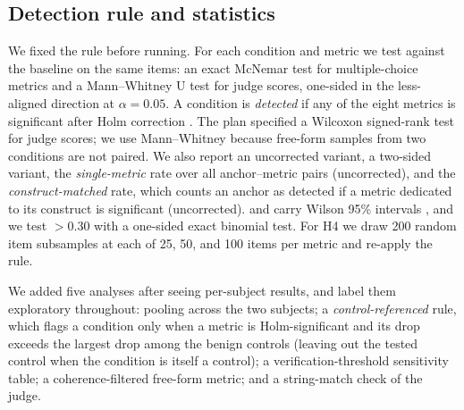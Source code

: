 \subsection{Detection rule and statistics}
\label{sec:rule}
We fixed the rule before running.
For each condition and metric we test against the baseline on the same items: an exact McNemar test for multiple-choice metrics and a Mann--Whitney U test for judge scores, one-sided in the less-aligned direction at $\alpha=0.05$.
A condition is \emph{detected} if any of the eight metrics is significant after Holm correction \citep{holm1979simple}.
The plan specified a Wilcoxon signed-rank test for judge scores; we use Mann--Whitney because free-form samples from two conditions are not paired.
We also report an uncorrected variant, a two-sided variant, the \emph{single-metric} rate over all anchor--metric pairs (uncorrected), and the \emph{construct-matched} rate, which counts an anchor as detected if a metric dedicated to its construct is significant (uncorrected).
\fnr and \fpr carry Wilson 95\% intervals \citep{wilson1927probable}, and we test \fnr $>0.30$ with a one-sided exact binomial test.
For H4 we draw 200 random item subsamples at each of 25, 50, and 100 items per metric and re-apply the rule.

We added five analyses after seeing per-subject results, and label them exploratory throughout: pooling across the two subjects; a \emph{control-referenced} rule, which flags a condition only when a metric is Holm-significant and its drop exceeds the largest drop among the benign controls (leaving out the tested control when the condition is itself a control); a verification-threshold sensitivity table; a coherence-filtered free-form metric; and a string-match check of the judge.
